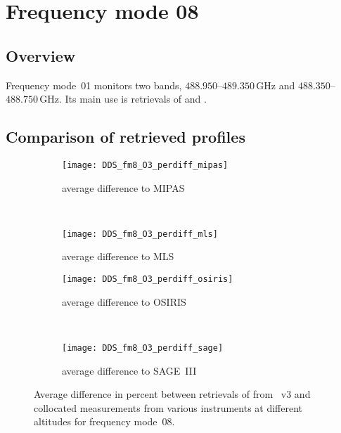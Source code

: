 \section{Frequency mode 08}
\label{sec:fm08}

\subsection{Overview}
\label{sec:fm08:overview}
Frequency mode~01 monitors two bands, $488.950$--$489.350\,\mathrm{GHz}$ and
$488.350$--$488.750\,\mathrm{GHz}$. Its main use is retrievals of 
and .


\subsection{Comparison of retrieved profiles}
\label{sec:fm08:comparison}



\begin{figure}[htpb]
    \centering
    \begin{subfigure}[b]{0.49\textwidth}
        \texttt{[image: DDS\_fm8\_O3\_perdiff\_mipas]}
        \caption{average difference to MIPAS}
        \label{fig:fm08:O3:profiles:MIPAS}
    \end{subfigure}
    \,
    \begin{subfigure}[b]{0.49\textwidth}
        \texttt{[image: DDS\_fm8\_O3\_perdiff\_mls]}
        \caption{average difference to MLS}
        \label{fig:fm08:O3:profiles:MLS}
    \end{subfigure}

    \begin{subfigure}[b]{0.49\textwidth}
        \texttt{[image: DDS\_fm8\_O3\_perdiff\_osiris]}
        \caption{average difference to OSIRIS}
        \label{fig:fm08:O3:profiles:OSIRIS}
    \end{subfigure}
    \,
    \begin{subfigure}[b]{0.49\textwidth}
        \texttt{[image: DDS\_fm8\_O3\_perdiff\_sage]}
        \caption{average difference to SAGE~III}
        \label{fig:fm08:O3:profiles:SAGEIII}
    \end{subfigure}
    \caption{Average difference in percent between retrievals of 
    from \smr~v3 and collocated measurements from various instruments at
    different altitudes for frequency mode~08.}

    \label{fig:fm08:O3:profiles}
\end{figure}

